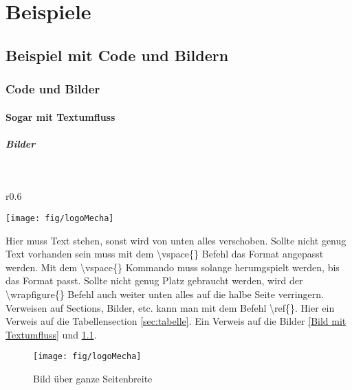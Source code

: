 \chapter{Beispiele}

\section{Beispiel mit Code und Bildern}
\label{sec:beispiel}

\subsection{Code und Bilder}
\label{sec:code-bild}

\subsubsection{Sogar mit Textumfluss}
\label{sec:floating-text}

\paragraph{Bilder}\mbox{}\\

\begin{wrapfigure}{r}{0.6\textwidth}
\vspace{-30pt}
  \begin{center}
    \texttt{[image: fig/logoMecha]}
  \end{center}
  \caption{Bild mit Textumfluss}
  \label{Bild mit Textumfluss}
  \vspace{-10pt}
\end{wrapfigure}

Hier muss Text stehen, sonst wird von unten alles verschoben. Sollte nicht genug Text vorhanden sein muss mit dem \textbackslash{}vspace\{\} Befehl das Format angepasst werden. Mit dem \textbackslash{}vspace\{\} Kommando muss solange herumgspielt werden, bis das Format passt. Sollte nicht genug Platz gebraucht werden, wird der \textbackslash{}wrapfigure\{\} Befehl auch weiter unten alles auf die halbe Seite verringern. Verweisen auf Sections, Bilder, etc. kann man mit dem Befehl \textbackslash{}ref\{\}. Hier ein Verweis auf die Tabellensection \ref{sec:tabelle}. Ein Verweis auf die Bilder \ref{Bild mit Textumfluss} und \ref{Bild über ganze Seitenbreite}.

\begin{figure}[H]
      \texttt{[image: fig/logoMecha]}
      \caption{Bild über ganze Seitenbreite}
      \label{Bild über ganze Seitenbreite}
\end{figure}
\newpage


